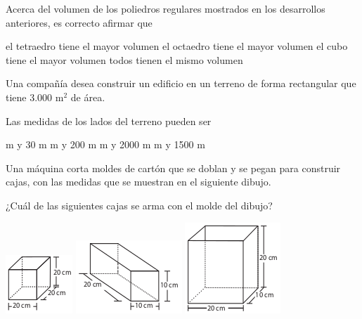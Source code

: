 \documentclass[addpoints]{exam}
\begin{document}
\begin{multicols}{2}
\begin{questions}
\begin{center}
\end{center}
Acerca del volumen de los poliedros regulares mostrados en los desarrollos anteriores, es correcto afirmar que
\begin{choices}
\choice el tetraedro tiene el mayor volumen
\choice el octaedro tiene el mayor volumen
\CorrectChoice el cubo tiene el mayor volumen
\choice todos tienen el mismo volumen
\end{choices}
\question Una compañía desea construir un edificio en un terreno de forma rectangular que tiene 3.000 m$^{2}$ de área.

Las medidas de los lados del terreno pueden ser
\begin{choices}
 m y 30 m
 m y 200 m
 m y 2000 m
 m y 1500 m
\end{choices}
\question Una máquina corta moldes de cartón que se doblan y se pegan para construir cajas, con las medidas que se muestran en el siguiente dibujo.
\begin{center}
\end{center}
¿Cuál de las siguientes cajas se arma con el molde del dibujo?
\begin{choices}
\choice \includegraphics[scale=.35]{Images/Pantallazo-36.png} 
\CorrectChoice \includegraphics[scale=.35]{Images/Pantallazo-37.png} 
\choice \includegraphics[scale=.35]{Images/Pantallazo-38.png} 

\end{choices}
\end{questions}
\end{multicols}
\end{document}
